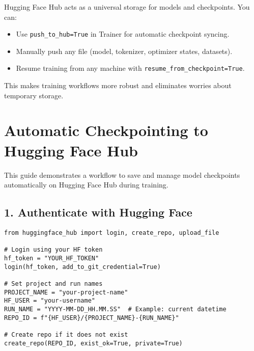 \documentclass[a4paper, 12pt]{article}
\begin{document}
\begin{tcolorbox}[colback=blue!10!white, colframe=blue!75!black, title=Summary]
Hugging Face Hub acts as a universal storage for models and checkpoints.  
You can:
\begin{itemize}
    \item Use \texttt{push\_to\_hub=True} in Trainer for automatic checkpoint syncing.
    \item Manually push any file (model, tokenizer, optimizer states, datasets).
    \item Resume training from any machine with \texttt{resume\_from\_checkpoint=True}.
\end{itemize}
This makes training workflows more robust and eliminates worries about temporary storage.
\end{tcolorbox}

\newpage
\section*{Automatic Checkpointing to Hugging Face Hub}

This guide demonstrates a workflow to save and manage model checkpoints automatically on Hugging Face Hub during training.

\subsection*{1. Authenticate with Hugging Face}

\begin{tcolorbox}[colback=blue!5!white, colframe=blue!75!black, title=Login to Hugging Face]
\begin{verbatim}
from huggingface_hub import login, create_repo, upload_file

# Login using your HF token
hf_token = "YOUR_HF_TOKEN"
login(hf_token, add_to_git_credential=True)

# Set project and run names
PROJECT_NAME = "your-project-name"
HF_USER = "your-username"
RUN_NAME = "YYYY-MM-DD_HH.MM.SS"  # Example: current datetime
REPO_ID = f"{HF_USER}/{PROJECT_NAME}-{RUN_NAME}"

# Create repo if it does not exist
create_repo(REPO_ID, exist_ok=True, private=True)
\end{verbatim}
\end{tcolorbox}
\end{document}

